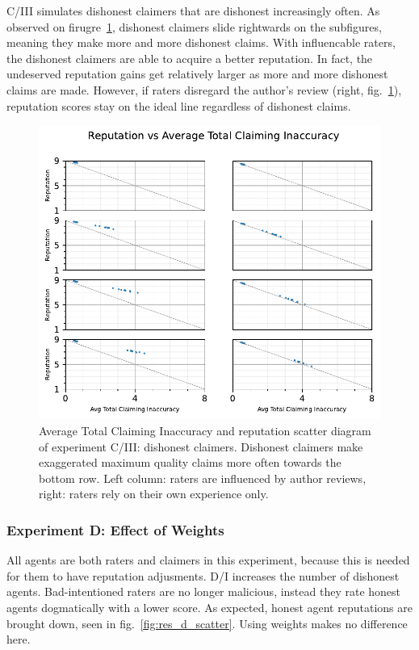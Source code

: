 \documentclass[%
    ]{\PathToTumTemplate/thesis/tum_thesis}
\begin{document}
C/III simulates dishonest claimers that are dishonest increasingly often.
As observed on firugre~\ref{fig:res_c3_scatter}, dishonest claimers slide rightwards on the subfigures, meaning they make more and more dishonest claims.
With influencable raters, the dishonest claimers are able to acquire a better reputation.
In fact, the undeserved reputation gains get relatively larger as more and more dishonest claims are made.
However, if raters disregard the author's review (right, fig.~\ref{fig:res_c3_scatter}), reputation scores stay on the ideal line regardless of dishonest claims.

\begin{figure}[tbp]
  \begin{center}
        \includegraphics[width=0.75\linewidth]	{../results/c3/AvgTotClaimInaccuracyAndReputationScatter_joined.pdf}
    \caption{
    Average Total Claiming Inaccuracy and reputation scatter diagram of experiment C/III: dishonest claimers.
    Dishonest claimers make exaggerated maximum quality claims more often towards the bottom row.
    Left column: raters are influenced by author reviews, right: raters rely on their own experience only.
    }
    \label{fig:res_c3_scatter}
  \end{center}
\end{figure}

\subsubsection{Experiment D: Effect of Weights}

All agents are both raters and claimers in this experiment, because this is needed for them to have reputation adjusments.
D/I increases the number of dishonest agents.
Bad-intentioned raters are no longer malicious, instead they rate honest agents dogmatically with a lower score.
As expected, honest agent reputations are brought down, seen in fig.~\ref{fig:res_d_scatter}.
Using weights makes no difference here.
\end{document}
